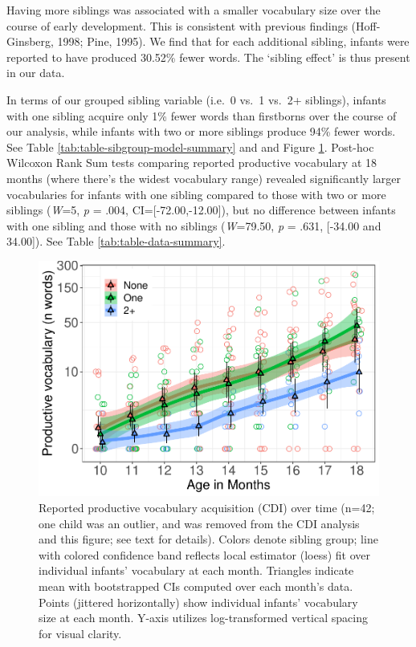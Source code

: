\documentclass[
  man,mask,floatsintext]{apa6}
\begin{document}
Having more siblings was associated with a smaller vocabulary size over the course of early development. This is consistent with previous findings (Hoff-Ginsberg, 1998; Pine, 1995). We find that for each additional sibling, infants were reported to have produced 30.52\% fewer words. The `sibling effect' is thus present in our data.

In terms of our grouped sibling variable (i.e.~0 vs.~1 vs.~2+ siblings), infants with one sibling acquire only 1\% fewer words than firstborns over the course of our analysis, while infants with two or more siblings produce 94\% fewer words. See Table \ref{tab:table-sibgroup-model-summary} and and Figure \ref{fig:Figure-SibGroup}. Post-hoc Wilcoxon Rank Sum tests comparing reported productive vocabulary at 18 months (where there's the widest vocabulary range) revealed significantly larger vocabularies for infants with one sibling compared to those with two or more siblings (\emph{W}=5, \emph{p} = .004, CI={[}-72.00,-12.00{]}), but no difference between infants with one sibling and those with no siblings (\emph{W}=79.50, \emph{p} = .631, {[}-34.00 and 34.00{]}). See Table \ref{tab:table-data-summary}.

\begin{figure}
\centering
\includegraphics{SiblingsStudyText-anon-revisions_files/figure-latex/Figure-SibGroup-1.pdf}
\caption{\label{fig:Figure-SibGroup}Reported productive vocabulary acquisition (CDI) over time (n=42; one child was an outlier, and was removed from the CDI analysis and this figure; see text for details). Colors denote sibling group; line with colored confidence band reflects local estimator (loess) fit over individual infants' vocabulary at each month. Triangles indicate mean with bootstrapped CIs computed over each month's data. Points (jittered horizontally) show individual infants' vocabulary size at each month. Y-axis utilizes log-transformed vertical spacing for visual clarity.}
\end{figure}
\end{document}
